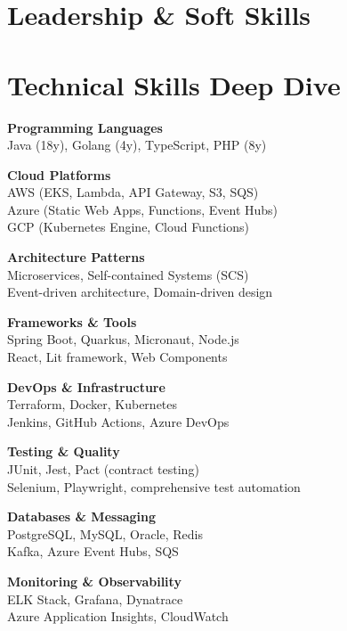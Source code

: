 \documentclass[11pt,a4paper,sans]{moderncv}
\begin{document}

\section{Leadership \& Soft Skills}


\section{Technical Skills Deep Dive}

\begin{multicols}{2}
\textbf{Programming Languages}\\
Java (18y), Golang (4y), TypeScript, PHP (8y)

\textbf{Cloud Platforms}\\
AWS (EKS, Lambda, API Gateway, S3, SQS)\\
Azure (Static Web Apps, Functions, Event Hubs)\\
GCP (Kubernetes Engine, Cloud Functions)

\textbf{Architecture Patterns}\\
Microservices, Self-contained Systems (SCS)\\
Event-driven architecture, Domain-driven design

\textbf{Frameworks \& Tools}\\
Spring Boot, Quarkus, Micronaut, Node.js\\
React, Lit framework, Web Components

\textbf{DevOps \& Infrastructure}\\
Terraform, Docker, Kubernetes\\
Jenkins, GitHub Actions, Azure DevOps

\textbf{Testing \& Quality}\\
JUnit, Jest, Pact (contract testing)\\
Selenium, Playwright, comprehensive test automation

\textbf{Databases \& Messaging}\\
PostgreSQL, MySQL, Oracle, Redis\\
Kafka, Azure Event Hubs, SQS

\textbf{Monitoring \& Observability}\\
ELK Stack, Grafana, Dynatrace\\
Azure Application Insights, CloudWatch
\end{multicols}
\end{document}
